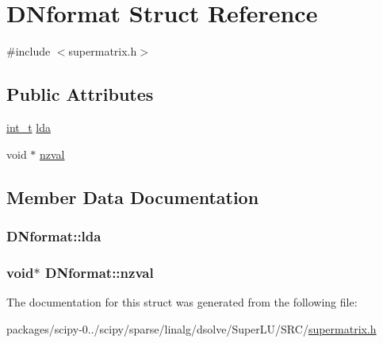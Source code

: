 \hypertarget{structDNformat}{}\section{D\+Nformat Struct Reference}
\label{structDNformat}


{\ttfamily \#include $<$supermatrix.\+h$>$}

\subsection*{Public Attributes}
\begin{DoxyCompactItemize}
\item 
\hyperlink{slu__cdefs_8h_ab6fd6105e64ed14a0c9281326f05e623}{int\+\_\+t} \hyperlink{structDNformat_a6b584837b30f33849c6c3b070aade816}{lda}
\item 
void $\ast$ \hyperlink{structDNformat_a54a061275c52aa9e38f4cb65da46d48c}{nzval}
\end{DoxyCompactItemize}


\subsection{Member Data Documentation}
\hypertarget{structDNformat_a6b584837b30f33849c6c3b070aade816}{}
\subsubsection[{lda}]{ D\+Nformat\+::lda}\label{structDNformat_a6b584837b30f33849c6c3b070aade816}
\hypertarget{structDNformat_a54a061275c52aa9e38f4cb65da46d48c}{}
\subsubsection[{nzval}]{\setlength{\rightskip}{0pt plus 5cm}void$\ast$ D\+Nformat\+::nzval}\label{structDNformat_a54a061275c52aa9e38f4cb65da46d48c}


The documentation for this struct was generated from the following file\+:\begin{DoxyCompactItemize}
\item 
packages/scipy-\/0../scipy/sparse/linalg/dsolve/\+Super\+L\+U/\+S\+R\+C/\hyperlink{supermatrix_8h}{supermatrix.\+h}\end{DoxyCompactItemize}
